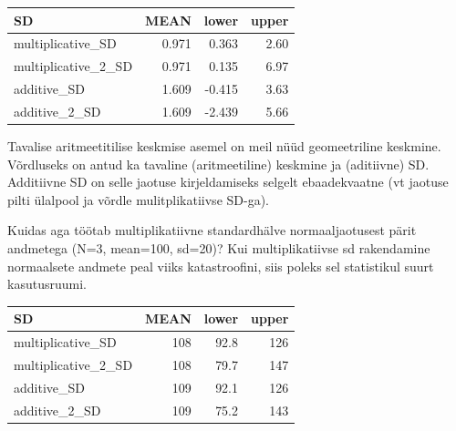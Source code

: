 \documentclass[]{book}
\newenvironment{Shaded}{\begin{snugshade}}{\end{snugshade}}
\newcommand{\KeywordTok}[1]{\textcolor[rgb]{0.13,0.29,0.53}{\textbf{#1}}}
\newcommand{\DataTypeTok}[1]{\textcolor[rgb]{0.13,0.29,0.53}{#1}}
\newcommand{\DecValTok}[1]{\textcolor[rgb]{0.00,0.00,0.81}{#1}}
\newcommand{\StringTok}[1]{\textcolor[rgb]{0.31,0.60,0.02}{#1}}
\newcommand{\CommentTok}[1]{\textcolor[rgb]{0.56,0.35,0.01}{\textit{#1}}}
\newcommand{\OperatorTok}[1]{\textcolor[rgb]{0.81,0.36,0.00}{\textbf{#1}}}
\newcommand{\NormalTok}[1]{#1}
\begin{document}
\begin{Shaded}
\end{Shaded}

\begin{tabular}{l|r|r|r}
\hline
SD & MEAN & lower & upper\\
\hline
multiplicative\_SD & 0.971 & 0.363 & 2.60\\
\hline
multiplicative\_2\_SD & 0.971 & 0.135 & 6.97\\
\hline
additive\_SD & 1.609 & -0.415 & 3.63\\
\hline
additive\_2\_SD & 1.609 & -2.439 & 5.66\\
\hline
\end{tabular}

Tavalise aritmeetitilise keskmise asemel on meil nüüd geomeetriline
keskmine. Võrdluseks on antud ka tavaline (aritmeetiline) keskmine ja
(aditiivne) SD. Additiivne SD on selle jaotuse kirjeldamiseks selgelt
ebaadekvaatne (vt jaotuse pilti ülalpool ja võrdle mulitplikatiivse
SD-ga).

Kuidas aga töötab multiplikatiivne standardhälve normaaljaotusest pärit
andmetega (N=3, mean=100, sd=20)? Kui multiplikatiivse sd rakendamine
normaalsete andmete peal viiks katastroofini, siis poleks sel
statistikul suurt kasutusruumi.

\begin{tabular}{l|r|r|r}
\hline
SD & MEAN & lower & upper\\
\hline
multiplicative\_SD & 108 & 92.8 & 126\\
\hline
multiplicative\_2\_SD & 108 & 79.7 & 147\\
\hline
additive\_SD & 109 & 92.1 & 126\\
\hline
additive\_2\_SD & 109 & 75.2 & 143\\
\hline
\end{tabular}
\end{document}
